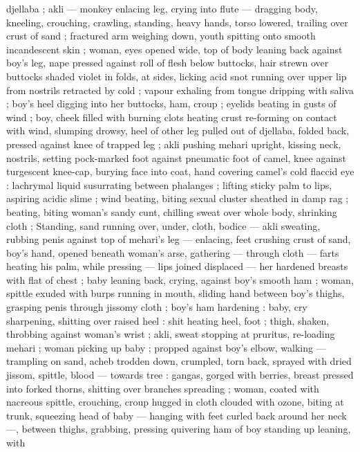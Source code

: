 djellaba ; akli --- monkey enlacing leg, crying into flute --- dragging 
body, kneeling, crouching, crawling, standing, heavy hands, torso 
lowered, trailing over crust of sand ; fractured arm weighing down, 
youth spitting onto smooth incandescent skin ; woman, eyes opened 
wide, top of body leaning back against boy's leg, nape pressed 
against roll of flesh below buttocks, hair strewn over buttocks shaded 
violet in folds, at sides, licking acid snot running over upper lip from 
nostrils retracted by cold ; vapour exhaling from tongue dripping with 
saliva ; boy's heel digging into her buttocks, ham, croup ; eyelids 
beating in gusts of wind ; boy, cheek filled with burning clots heating 
crust re-forming on contact with wind, slumping drowsy, heel of other 
leg pulled out of djellaba, folded back, pressed against knee of 
trapped leg ; akli pushing mehari upright, kissing neck, nostrils, 
setting pock-marked foot against pneumatic foot of camel, knee 
against turgescent knee-cap, burying face into coat, hand covering 
camel's cold flaccid eye : lachrymal liquid susurrating between 
phalanges ; lifting sticky palm to lips, aspiring acidic slime ; wind 
beating, biting sexual cluster sheathed in damp rag ; beating, biting 
woman's sandy cunt, chilling sweat over whole body, shrinking cloth 
; Standing, sand running over, under, cloth, bodice --- akli sweating, 
rubbing penis against top of mehari's leg --- enlacing, feet crushing 
crust of sand, boy's hand, opened beneath woman's arse, gathering 
--- through cloth --- farts heating his palm, while pressing --- lips 
joined displaced --- her hardened breasts with flat of chest ; baby 
leaning back, crying, against boy's smooth ham ; woman, spittle 
exuded with burps running in mouth, sliding hand between boy's 
thighs, grasping penis through jissomy cloth ; boy's ham hardening 
: baby, cry sharpening, shitting over raised heel : shit heating heel, 
foot ; thigh, shaken, throbbing against woman's wrist ; akli, sweat 
stopping at pruritus, re-loading mehari ; woman picking up baby ; 
propped against boy's elbow, walking --- trampling on sand, acheb 
trodden down, crumpled, torn back, sprayed with dried jissom, 
spittle, blood --- towards tree : gangas, gorged with berries, breast 
pressed into forked thorns, shitting over branches spreading ; 
woman, coated with nacreous spittle, crouching, croup hugged in 
cloth clouded with ozone, biting at trunk, squeezing head of baby --- 
hanging with feet curled back around her neck ---, between thighs, 
grabbing, pressing quivering ham of boy standing up leaning, with 
